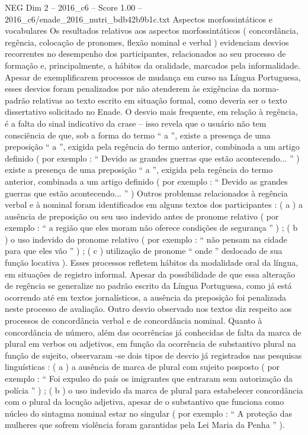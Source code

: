 \begin{textsample}{NEG Dim 2 – 2016\_c6 – Score 1.00 – 2016\_c6/enade\_2016\_nutri\_bdb42b9b1c.txt}
Aspectos morfossintáticos e vocabulares Os resultados relativos aos aspectos morfossintáticos ( concordância, regência, colocação de pronomes, flexão nominal e verbal ) evidenciam desvios recorrentes no desempenho dos participantes, relacionados ao seu processo de formação e, principalmente, a hábitos da oralidade, marcados pela informalidade.
Apesar de exemplificarem processos de mudança em curso na Língua Portuguesa, esses desvios foram penalizados por não atenderem às exigências da norma-padrão relativas ao texto escrito em situação formal, como deveria ser o texto dissertativo solicitado no Enade.
O desvio mais frequente, em relação à regência, é a falta do sinal indicativo da crase – isso revela que o usuário não tem consciência de que, sob a forma do termo “ a ”, existe a presença de uma preposição “ a ”, exigida pela regência do termo anterior, combinada a um artigo definido ( por exemplo : “ Devido as grandes guerras que estão acontecendo... ” ) existe a presença de uma preposição “ a ”, exigida pela regência do termo anterior, combinada a um artigo definido ( por exemplo : “ Devido as grandes guerras que estão acontecendo... ” ) Outros problemas relacionados à regência verbal e à nominal foram identificados em alguns textos dos participantes : ( a ) a ausência de preposição ou seu uso indevido antes de pronome relativo ( por exemplo : “ a região que eles moram não oferece condições de segurança ” ) ; ( b ) o uso indevido do pronome relativo ( por exemplo : “ não pensam na cidade para que eles vão ” ) ; ( c ) utilização de pronome “ onde ” deslocado de sua função locativa ).
Esses processos refletem hábitos da modalidade oral da língua, em situações de registro informal.
Apesar da possibilidade de que essa alteração de regência se generalize no padrão escrito da Língua Portuguesa, como já está ocorrendo até em textos jornalísticos, a ausência da preposição foi penalizada neste processo de avaliação.
Outro desvio observado nos textos diz respeito aos processos de concordância verbal e de concordância nominal.
Quanto à concordância de número, além das ocorrências já conhecidas de falta da marca de plural em verbos ou adjetivos, em função da ocorrência de substantivo plural na função de sujeito, observaram -se dois tipos de desvio já registrados nas pesquisas linguísticas : ( a ) a ausência de marca de plural com sujeito posposto ( por exemplo : “ Foi expulso do país os imigrantes que entraram sem autorização da polícia ” ) ; ( b ) o uso indevido da marca de plural para estabelecer concordância com o plural da locução adjetiva, apesar de o substantivo que funciona como núcleo do sintagma nominal estar no singular ( por exemplo : “ A proteção das mulheres que sofrem violência foram garantidas pela Lei Maria da Penha ” ).

\end{textsample}
